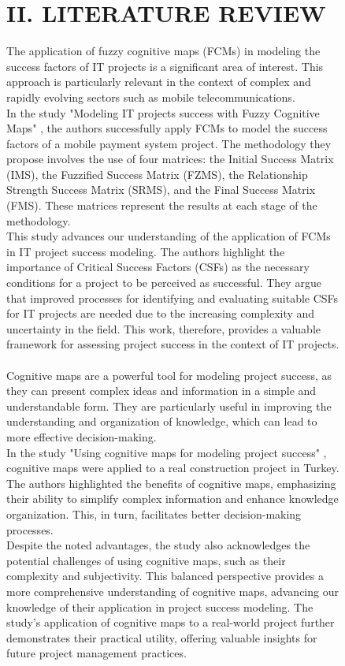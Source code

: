 \documentclass{article}
\begin{document}
\begin{figure}[!t]
\begin{minipage}{0.49\textwidth}
\begin{center}
                \chapter{II. LITERATURE REVIEW}
            \end{center}
            The application of fuzzy cognitive maps (FCMs) in modeling the success factors of IT projects is a significant area of interest. This approach is particularly relevant in the context of complex and rapidly evolving sectors such as mobile telecommunications.\\
            In the study "{}Modeling IT projects success with Fuzzy Cognitive Maps"{} \cite{litlink18}, the authors successfully apply FCMs to model the success factors of a mobile payment system project. The methodology they propose involves the use of four matrices: the Initial Success Matrix (IMS), the Fuzzified Success Matrix (FZMS), the Relationship Strength Success Matrix (SRMS), and the Final Success Matrix (FMS). These matrices represent the results at each stage of the methodology.\\
            This study advances our understanding of the application of FCMs in IT project success modeling. The authors highlight the importance of Critical Success Factors (CSFs) as the necessary conditions for a project to be perceived as successful. They argue that improved processes for identifying and evaluating suitable CSFs for IT projects are needed due to the increasing complexity and uncertainty in the field. This work, therefore, provides a valuable framework for assessing project success in the context of IT projects.\\
            ~\\
            Cognitive maps are a powerful tool for modeling project success, as they can present complex ideas and information in a simple and understandable form. They are particularly useful in improving the understanding and organization of knowledge, which can lead to more effective decision-making.\\
            In the study "{}Using cognitive maps for modeling project success"{} \cite{litlink19}, cognitive maps were applied to a real construction project in Turkey. The authors highlighted the benefits of cognitive maps, emphasizing their ability to simplify complex information and enhance knowledge organization. This, in turn, facilitates better decision-making processes.\\
            Despite the noted advantages, the study also acknowledges the potential challenges of using cognitive maps, such as their complexity and subjectivity. This balanced perspective provides a more comprehensive understanding of cognitive maps, advancing our knowledge of their application in project success modeling. The study's application of cognitive maps to a real-world project further demonstrates their practical utility, offering valuable insights for future project management practices.\\

\end{minipage}
\end{figure}
\end{document}
